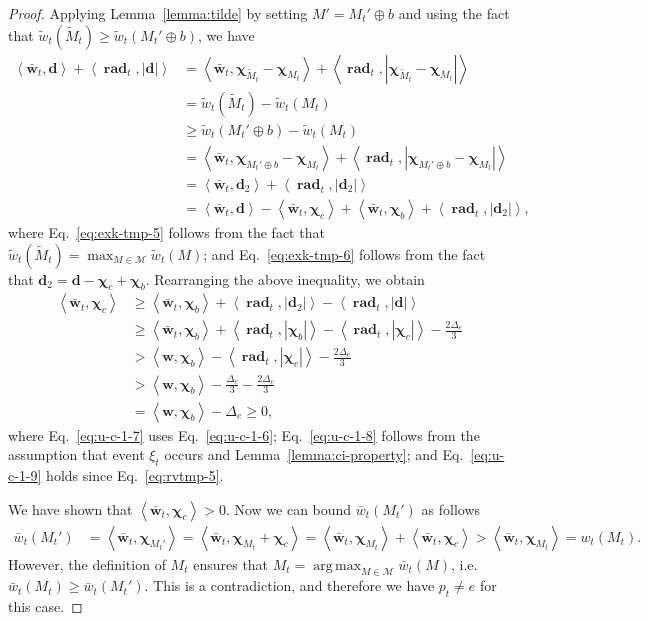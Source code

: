 \documentclass{article}
\newcommand{\M}{\mathcal M}
\DeclareMathOperator{\rad}{rad}
\DeclareMathOperator*{\argmax}{arg\,max}
\newcommand{\inn}[1]{\left\langle #1 \right\rangle}
\renewcommand{\vec}[1]{\boldsymbol{#1}}
\begin{document}
\begin{proof}
Applying Lemma~\ref{lemma:tilde} by setting $M' = M_t' \oplus b$ and using the fact that $\tilde w_t(\tilde M_t) \ge \tilde w_t(M_t' \oplus b)$, we have 
\begin{align}
\inn{\vec {\bar w}_t, \vec d}+\inn{\vec \rad_t, |\vec d|}
& = \inn{\vec {\bar w}_t, \vec \chi_{\tilde M_t}-\vec\chi_{M_t}}+\inn{\vec \rad_t, |\vec \chi_{\tilde M_t}-\vec\chi_{M_t}|}\nonumber\\
& = \tilde w_t(\tilde M_t)- \tilde w_t(M_t)\nonumber\\
& \ge \tilde w_t(M_t'\oplus b) - \tilde w_t(M_t)\label{eq:exk-tmp-5}\\
&= \inn{\vec {\bar w}_t, \vec \chi_{M_t' \oplus b}-\vec\chi_{M_t}}+\inn{\vec \rad_t, |\vec \chi_{M_t' \oplus b}-\vec\chi_{M_t}|}\nonumber\\
&= \inn{\vec {\bar w}_t, \vec d_2}+\inn{\vec \rad_t, |\vec d_2|}\nonumber \\
&= \inn{\vec {\bar w}_t, \vec d}-\inn{\vec {\bar w}_t, \vec \chi_c}+\inn{\vec {\bar w}_t,\vec\chi_b}+\inn{\vec \rad_t, |\vec d_2|},\label{eq:exk-tmp-6}
\end{align}
where Eq.~\eqref{eq:exk-tmp-5} follows from the fact that $\tilde w_t(\tilde M_t) = \max_{M\in \M} \tilde w_t(M)$;
and Eq.~\eqref{eq:exk-tmp-6} follows from the fact that $\vec d_2 = \vec d-\vec \chi_{c}+\vec \chi_{b}$.
Rearranging the above inequality, we obtain
\begin{align}
\inn{\vec {\bar w}_t, \vec \chi_c} &\ge \inn{\vec {\bar w}_t, \vec \chi_b}+\inn{\vec \rad_t, |\vec d_2|}-\inn{\vec \rad_t, |\vec d|}\nonumber \\
&\ge  \inn{\vec {\bar w}_t, \vec \chi_b}+
\left\langle \vec \rad_t, |\vec\chi_b| \right\rangle
  -\left\langle \vec \rad_t, |\vec\chi_c| \right\rangle
  -\frac{2\Delta_e}{3} \label{eq:u-c-1-7}\\
&> \inn{\vec w, \vec \chi_b}-\inn{\vec \rad_t, |\vec \chi_c|}-\frac{2\Delta_e}{3} \label{eq:u-c-1-8}\\
&> \inn{\vec w, \vec \chi_b}-\frac{\Delta_e}{3}-\frac{2\Delta_e}{3} \label{eq:u-c-1-9}\\
&= \inn{\vec w, \vec \chi_b}-\Delta_e \ge 0,
\end{align}
where Eq.~\eqref{eq:u-c-1-7} uses Eq.~\eqref{eq:u-c-1-6}; 
Eq.~\eqref{eq:u-c-1-8} follows from the assumption that event $\xi_t$ occurs and Lemma~\ref{lemma:ci-property};
and Eq.~\eqref{eq:u-c-1-9} holds since Eq.~\eqref{eq:rvtmp-5}.

We have shown that $\inn{\vec {\bar w}_t,\vec \chi_c}>0$. Now we can bound $\bar w_t(M_t')$ as follows
\begin{align*}
 \bar w_t(M_t') &= \inn{\vec {\bar w}_t, \vec \chi_{M_t'}} = \inn{\vec {\bar w}_t, \vec \chi_{M_t}+\vec \chi_c} =
 \inn{\vec {\bar w}_t, \vec \chi_{M_t}}+\inn{\vec {\bar w}_t, \vec \chi_c} > \inn{\vec {\bar w}_t, \vec \chi_{M_t}} = w_t(M_t).
\end{align*}
However, the definition of $M_t$ ensures that $M_t = \argmax_{M\in\M} \bar w_t(M)$, i.e. $\bar w_t(M_t) \ge \bar w_t(M_t')$. 
This is a contradiction, and therefore we have $p_t \not=e$ for this case.


\end{proof}
\end{document}
